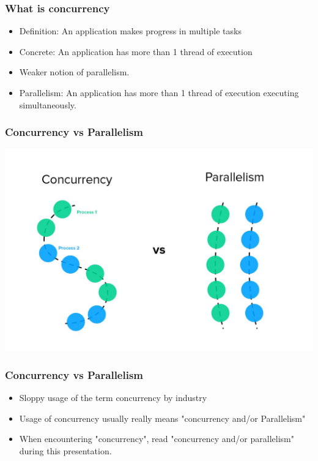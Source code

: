 \documentclass{beamer}
\begin{document}
\begin{frame}
  \frametitle{What is concurrency}

  \begin{itemize}
    \item Definition: An application makes progress in multiple tasks
    \item Concrete: An application has more than 1 thread of execution
    \item Weaker notion of parallelism.
    \item Parallelism: An application has more than 1 thread of execution
          executing simultaneously.
  \end{itemize}
\end{frame}

\begin{frame}
  \frametitle{Concurrency vs Parallelism}
  \begin{center}
  \includegraphics[width=0.8\linewidth]{./figures/concurrency-parallelism.jpeg}
  \end{center}
\end{frame}

\begin{frame}
  \frametitle{Concurrency vs Parallelism}
  \begin{itemize}
      \item Sloppy usage of the term concurrency by industry
      \item Usage of concurrency usually really means "concurrency and/or Parallelism"
      \item When encountering "concurrency", read "concurrency and/or parallelism" during
      this presentation.
  \end{itemize}
\end{frame}
\end{document}
